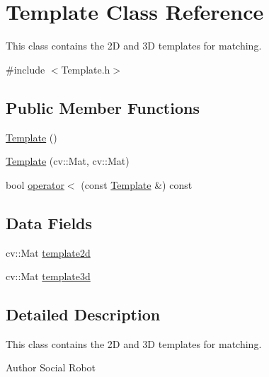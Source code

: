 \hypertarget{classTemplate}{\section{Template Class Reference}
\label{classTemplate}
}


This class contains the 2\-D and 3\-D templates for matching.  




{\ttfamily \#include $<$Template.\-h$>$}

\subsection*{Public Member Functions}
\begin{DoxyCompactItemize}
\item 
\hyperlink{classTemplate_afea5166b9ca0022fe21c2ed4882c161a}{Template} ()
\item 
\hyperlink{classTemplate_a9234aea5815f2a8d8bde56f635b2d2f3}{Template} (cv\-::\-Mat, cv\-::\-Mat)
\item 
bool \hyperlink{classTemplate_ad8d32fca5fa3372a2e67fdc456440e6c}{operator$<$} (const \hyperlink{classTemplate}{Template} \&) const 
\end{DoxyCompactItemize}
\subsection*{Data Fields}
\begin{DoxyCompactItemize}
\item 
cv\-::\-Mat \hyperlink{classTemplate_a65d3e446fb6ac165be19da2d747e85ed}{template2d}
\item 
cv\-::\-Mat \hyperlink{classTemplate_a27b16dc049359b1ac3ee24b08841ba56}{template3d}
\end{DoxyCompactItemize}


\subsection{Detailed Description}
This class contains the 2\-D and 3\-D templates for matching. 

\begin{DoxyAuthor}{Author}
Social Robot 
\end{DoxyAuthor}


